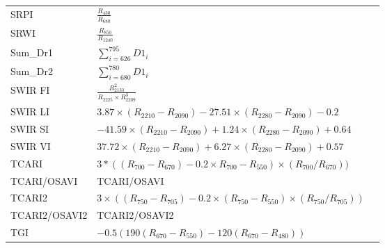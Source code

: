 \documentclass[remotesensing,article,submit,moreauthors,pdftex]{Definitions/mdpi}
\begin{document}
{\begin{supertabular}{lll}
		SRPI            & $\frac{R_{430}}{R_{680}}$                                                                            & \cite{penuelasj.1995}         \\
		SRWI            & $\frac{R_{850}}{R_{1240}}$                                                                           & \cite{zarco-tejada2003a}      \\
		Sum\_Dr1        & $\sum_{i=626}^{795} D1_i$                                                                            & \cite{elvidge1995}            \\
		Sum\_Dr2        & $\sum_{i=680}^{780} D1_i$                                                                            & \cite{filella1994}            \\
		SWIR FI         & $\frac{R_{2133}^2}{R_{2225} \times R_{2209}^3}$                                                      & \cite{levin2007}              \\
		\midrule
		SWIR LI         & \parbox{3.8cm}{$3.87  \times (R_{2210} - R_{2090}) - 27.51 \times (R_{2280} - R_{2090}) - 0.2$}      & \cite{lobell2001}             \\
		\midrule
		SWIR SI         & \parbox{3.8cm}{$-41.59 \times (R_{2210} - R_{2090}) + 1.24 \times (R_{2280} - R_{2090}) + 0.64 $}    & \cite{lobell2001}             \\
		\midrule
		SWIR VI         & \parbox{3.8cm}{$37.72  \times (R_{2210} - R_{2090}) + 6.27 \times (R_{2280} - R_{2090}) + 0.57$}     & \cite{lobell2001}             \\
		\midrule
		TCARI           & \parbox{3.8cm}{$3*((R_{700}-R_{670})-0.2\times R_{700}-R_{550})\times (R_{700}/R_{670}))$}           & \cite{haboudane2002}          \\
		\midrule
		TCARI/OSAVI     & TCARI/OSAVI                                                                                          & \cite{haboudane2002}          \\
		\midrule
		TCARI2          & \parbox{3.8cm}{$3 \times ((R_{750}-R_{705})-0.2 \times (R_{750}-R_{550}) \times (R_{750}/R_{705}))$} & \cite{wu2008a}                \\
		\midrule
		TCARI2/OSAVI2   & TCARI2/OSAVI2                                                                                        & \cite{wu2008a}                \\
		\midrule
		TGI             & \parbox{3.8cm}{$-0.5 (190 (R_{670} - R_{550} ) - 120 (R_{670} - R_{480}))$}                          & \cite{hunt2013}               \\

\end{supertabular}}
\end{document}
